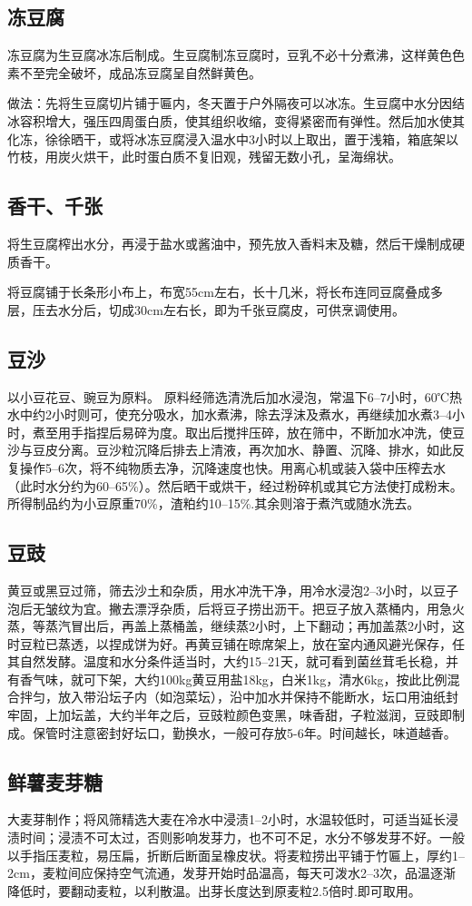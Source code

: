 \documentclass{ctexbook}
\begin{document}
\subsection{冻豆腐}
冻豆腐为生豆腐冰冻后制成。生豆腐制冻豆腐时，豆乳不必十分煮沸，这样黄色色素不至完全破坏，成品冻豆腐呈自然鲜黄色。

做法：先将生豆腐切片铺于匾内，冬天置于户外隔夜可以冰冻。生豆腐中水分因结冰容积增大，强压四周蛋白质，使其组织收缩，变得紧密而有弹性。然后加水使其化冻，徐徐晒干，或将冰冻豆腐浸入温水中3小时以上取出，置于浅箱，箱底架以竹枝，用炭火烘干，此时蛋白质不复旧观，残留无数小孔，呈海绵状。
\subsection{香干、千张}
将生豆腐榨出水分，再浸于盐水或酱油中，预先放入香料末及糖，然后干燥制成硬质香干。

将豆腐铺于长条形小布上，布宽55cm左右，长十几米，将长布连同豆腐叠成多层，压去水分后，切成30cm左右长，即为千张豆腐皮，可供烹调使用。
\subsection{豆沙}
以小豆花豆、豌豆为原料。
原料经筛选清洗后加水浸泡，常温下6--7小时，60℃热水中约2小时则可，使充分吸水，加水煮沸，除去浮沫及煮水，再继续加水煮3--4小时，煮至用手指捏后易碎为度。取出后搅拌压碎，放在筛中，不断加水冲洗，使豆沙与豆皮分离。豆沙粒沉降后排去上清液，再次加水、静置、沉降、排水，如此反复操作5--6次，将不纯物质去净，沉降速度也快。用离心机或装入袋中压榨去水（此时水分约为60--65\%）。然后晒干或烘干，经过粉碎机或其它方法使打成粉末。所得制品约为小豆原重70\%，渣粕约10--15\%.其余则溶于煮汽或随水洗去。
\subsection{豆豉}
黄豆或黑豆过筛，筛去沙土和杂质，用水冲洗干净，用冷水浸泡2--3小时，以豆子泡后无皱纹为宜。撇去漂浮杂质，后将豆子捞出沥干。把豆子放入蒸桶内，用急火蒸，等蒸汽冒出后，再盖上蒸桶盖，继续蒸2小时，上下翻动；再加盖蒸2小时，这时豆粒已蒸透，以捏成饼为好。再黄豆铺在晾席架上，放在室内通风避光保存，任其自然发酵。温度和水分条件适当时，大约15--21天，就可看到菌丝茸毛长稳，并有香气味，就可下架，大约100kg黄豆用盐18kg，白米1kg，清水6kg，按此比例混合拌匀，放入带沿坛子内（如泡菜坛），沿中加水并保持不能断水，坛口用油纸封牢固，上加坛盖，大约半年之后，豆豉粒颜色变黑，味香甜，子粒滋润，豆豉即制成。保管时注意密封好坛口，勤换水，一般可存放5-6年。时间越长，味道越香。
\subsection{鲜薯麦芽糖}
大麦芽制作；将风筛精选大麦在冷水中浸渍1--2小时，水温较低时，可适当延长浸渍时间；浸渍不可太过，否则影响发芽力，也不可不足，水分不够发芽不好。一般以手指压麦粒，易压扁，折断后断面呈橡皮状。将麦粒捞出平铺于竹匾上，厚约1--2cm，麦粒间应保持空气流通，发芽开始时品温高，每天可泼水2--3次，品温逐渐降低时，要翻动麦粒，以利散温。出芽长度达到原麦粒2.5倍时.即可取用。
\end{document}
